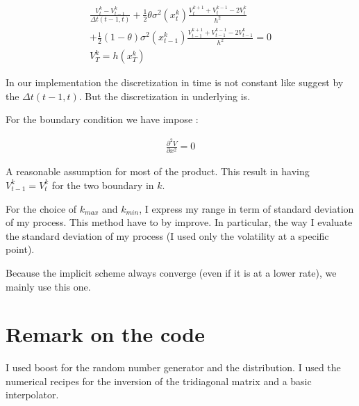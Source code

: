 \documentclass[11pt,twoside,a4paper]{article}
\begin{document}
\begin{eqnarray*}
  \frac{V^k_t - V^k_{t-1}}{\Delta t(t-1,t) } +  \frac{1}{2} \theta \sigma^2(x^k_t) \frac{V^{k+1}_t + V^{k-1}_{t} - 2 V^{k}_{t} }{h^2}\\
	+ \frac{1}{2}  (1 - \theta) \sigma^2(x^k_{t-1}) \frac{V^{k+1}_{t-1} + V^{k-1}_{t-1} - 2 V^{k}_{t-1} }{h^2} = 0\\
	V^k_T = h(x^k_T)
\end{eqnarray*}

In our implementation the discretization in time is not constant like suggest by the $\Delta t(t-1,t)$. But the discretization in underlying is.

For the boundary condition we have impose :

\begin{eqnarray*}
  \frac{\partial^2 V}{\partial x^2} = 0
\end{eqnarray*}

A reasonable assumption for most of the product. This result in having $V^k_{t-1} = V^k_t$ for the two boundary in $k$.

For the choice of $k_{max}$ and $k_{min}$, I express my range in term of standard deviation of my process. This method have to by improve. In particular, the way I evaluate the standard deviation of my process (I used only the volatility at a specific point).

Because the implicit scheme always converge (even if it is at a lower rate), we mainly use this one.

\section{Remark on the code}

I used boost for the random number generator and the distribution.
I used the numerical recipes for the inversion of the tridiagonal matrix and a basic interpolator.




\end{document}
